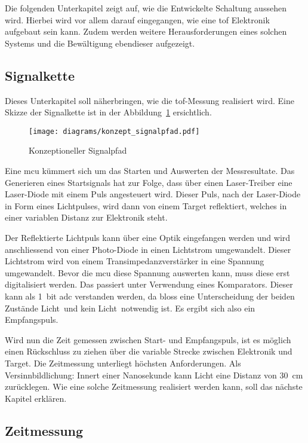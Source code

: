 Die folgenden Unterkapitel zeigt auf, wie die Entwickelte Schaltung aussehen wird. Hierbei wird vor allem darauf eingegangen,
wie eine \acrlong{tof} Elektronik aufgebaut sein kann. Zudem werden weitere Herausforderungen eines solchen Systems und die
Bewältigung ebendieser aufgezeigt.

\subsection{Signalkette}

Dieses Unterkapitel soll näherbringen, wie die \acrshort{tof}-Messung realisiert wird. Eine Skizze der Signalkette ist in der
Abbildung~\ref{fig:konzept_signalpfad} ersichtlich.

\begin{figure}[H]
    \centering
    \texttt{[image: diagrams/konzept\_signalpfad.pdf]}
    \caption{Konzeptioneller Signalpfad}\label{fig:konzept_signalpfad}
\end{figure}

Eine \acrshort{mcu} kümmert sich um das Starten und Auswerten der Messresultate. Das Generieren eines Startsignals hat
zur Folge, dass über einen Laser-Treiber eine Laser-Diode mit einem Puls angesteuert wird. Dieser Puls, nach der Laser-Diode
in Form eines Lichtpulses, wird dann von einem Target reflektiert, welches in einer variablen Distanz zur Elektronik steht.

Der Reflektierte Lichtpuls kann über eine Optik eingefangen werden und wird anschliessend von einer Photo-Diode in einen
Lichtstrom umgewandelt. Dieser Lichtstrom wird von einem Transimpedanzverstärker in eine Spannung umgewandelt. Bevor die
\acrshort{mcu} diese Spannung auswerten kann, muss diese erst digitalisiert werden. Das passiert unter Verwendung eines Komparators.
Dieser kann als 1~bit \acrshort{adc} verstanden werden, da bloss eine Unterscheidung der beiden Zustände \dq Licht\dq\ und
\dq kein Licht\dq\ notwendig ist. Es ergibt sich also ein Empfangspuls.

Wird nun die Zeit gemessen zwischen Start- und Empfangspuls, ist es möglich einen Rückschluss zu ziehen über die variable Strecke
zwischen Elektronik und Target. Die Zeitmessung unterliegt höchsten Anforderungen. Als Versinnbildlichung: Innert einer Nanosekunde
kann Licht eine Distanz von 30~cm zurücklegen. Wie eine solche Zeitmessung realisiert werden kann, soll das nächste Kapitel erklären.

\subsection{Zeitmessung}


